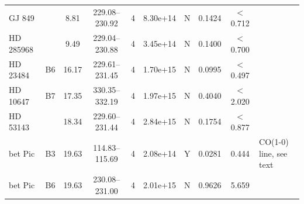 \documentclass{openjournal}
\begin{document}
\begin{table}
\begin{tabularx}{\textwidth}{@{}l c c c c c c c c X@{}}
GJ 849 &  & 8.81 & 229.08--230.92 & 4 & 8.30e+14 & N & 0.1424 & $<$0.712 &  \\
HD 285968 &  & 9.49 & 229.04--230.88 & 4 & 3.45e+14 & N & 0.1400 & $<$0.700 &  \\
HD 23484 & B6 & 16.17 & 229.61--231.45 & 4 & 1.70e+15 & N & 0.0995 & $<$0.497 &  \\
HD 10647 & B7 & 17.35 & 330.35--332.19 & 4 & 1.97e+15 & N & 0.4040 & $<$2.020 &  \\
HD 53143 &  & 18.34 & 229.60--231.44 & 4 & 2.84e+15 & N & 0.1754 & $<$0.877 &  \\
bet Pic & B3 & 19.63 & 114.83--115.69 & 4 & 2.08e+14 & Y & 0.0281 & 0.444 & CO(1-0) line, see text \\
bet Pic & B6 & 19.63 & 230.08--231.00 & 4 & 2.01e+15 & N & 0.9626 & 5.659 &  \\
\hline
\end{tabularx}
\end{table}
\end{document}
